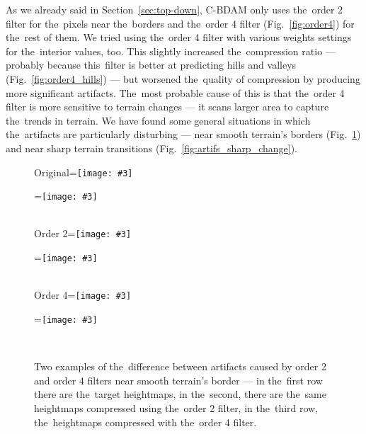 As we already said in Section~\ref{sec:top-down}, C-BDAM only uses the~order 2 filter for the~pixels near the~borders and the~order 4 filter (Fig.~\ref{fig:order4}) for the~rest of them. We tried using the~order 4 filter with various weights settings for the~interior values, too. This slightly increased the~compression ratio --- probably because this~filter is better at predicting hills and valleys (Fig.~\ref{fig:order4_hills}) --- but worsened the~quality of compression by producing more significant artifacts. The~most probable cause of this is that the~order 4 filter is more sensitive to terrain changes --- it scans larger area to capture the~trends in terrain. We have found some general situations in which the~artifacts are particularly disturbing --- near smooth terrain's borders (Fig.~\ref{fig:artifs_border}) and near sharp terrain transitions (Fig.~\ref{fig:artifs_sharp_change}). 

\newcommand{\vcentered}[1]{\begingroup\setbox0=\hbox{#1}\parbox{\wd0}{\box0}\endgroup}

\newcommand{\artifWidth}{160}
\newcommand{\artifHeight}{120}
\newcommand{\incimg}[3]{\texttt{[image: \#3]}}
\newcommand{\incimgvcenter}[3]{\vcentered{\incimg{#1}{#2}{#3}}}
\newcommand{\incartifborder}[1]{\incimgvcenter{\artifWidth}{\artifHeight}{#1}}
\newcommand{\hspacehead}{\hspace{0.4cm}}

\begin{figure}
	\begin{center}
	Original\hspacehead\incartifborder{figures/artif_orig0.png} 
	\incartifborder{figures/artif_orig1.png} \\  
	Order 2\hspacehead\incartifborder{figures/artif_four0.png} 
	\incartifborder{figures/artif_four1.png} \\ 
	Order 4\hspacehead\incartifborder{figures/artif_twelve0.png} 
	\incartifborder{figures/artif_twelve1.png} \\ 
	\end{center}
	\caption{Two examples of the~difference between artifacts caused by order 2 and order 4 filters near smooth terrain's border --- in the~first row there are the~target heightmaps, in the~second, there are the~same heightmaps compressed using the~order 2 filter, in the~third row, the~heightmaps compressed with the~order 4 filter.}
	\label{fig:artifs_border}
\end{figure}

\newcommand{\incartifchange}[1]{\incimgvcenter{\artifWidth}{\artifWidth}{#1}}

